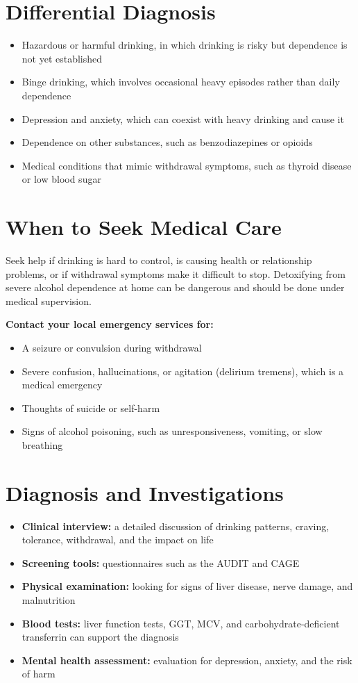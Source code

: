 \section*{Differential Diagnosis}
\begin{itemize}
    \item Hazardous or harmful drinking, in which drinking is risky but dependence is not yet established
    \item Binge drinking, which involves occasional heavy episodes rather than daily dependence
    \item Depression and anxiety, which can coexist with heavy drinking and cause it
    \item Dependence on other substances, such as benzodiazepines or opioids
    \item Medical conditions that mimic withdrawal symptoms, such as thyroid disease or low blood sugar
\end{itemize}

\section*{When to Seek Medical Care}
Seek help if drinking is hard to control, is causing health or relationship problems, or if withdrawal symptoms make it difficult to stop. Detoxifying from severe alcohol dependence at home can be dangerous and should be done under medical supervision.

\textbf{Contact your local emergency services for:}
\begin{itemize}
    \item A seizure or convulsion during withdrawal
    \item Severe confusion, hallucinations, or agitation (delirium tremens), which is a medical emergency
    \item Thoughts of suicide or self-harm
    \item Signs of alcohol poisoning, such as unresponsiveness, vomiting, or slow breathing
\end{itemize}

\section*{Diagnosis and Investigations}
\begin{itemize}
    \item \textbf{Clinical interview:} a detailed discussion of drinking patterns, craving, tolerance, withdrawal, and the impact on life
    \item \textbf{Screening tools:} questionnaires such as the AUDIT and CAGE
    \item \textbf{Physical examination:} looking for signs of liver disease, nerve damage, and malnutrition
    \item \textbf{Blood tests:} liver function tests, GGT, MCV, and carbohydrate-deficient transferrin can support the diagnosis
    \item \textbf{Mental health assessment:} evaluation for depression, anxiety, and the risk of harm
\end{itemize}

